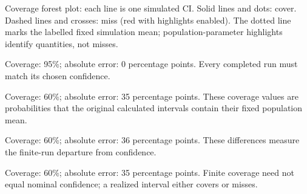 \begin{minipage}[t]{.69\linewidth}
\begin{center}
\par\small Coverage forest plot: each line is one simulated $\mathrm{CI}$.
Solid lines and dots: cover. Dashed lines and crosses: miss (red with highlights enabled).
The dotted line marks the labelled fixed simulation mean; population-parameter highlights identify quantities, not misses.
\end{center}
\end{minipage}\par

\clearpage
{}
\begin{answeroptions}
\item Coverage: 95\%; absolute error: 0 percentage points. Every completed run must match its chosen confidence.
\item Coverage: 60\%; absolute error: 35 percentage points. These coverage values are probabilities that the original calculated intervals contain their fixed population mean.
\item Coverage: 60\%; absolute error: 36 percentage points. These differences measure the finite-run departure from confidence.
\item Coverage: 60\%; absolute error: 35 percentage points. Finite coverage need not equal nominal confidence; a realized interval either covers or misses.
\end{answeroptions}
\clearpage
